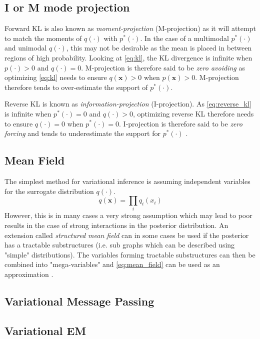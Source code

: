 \subsection{I or M mode projection}

Forward KL is also known as \textit{moment-projection} (M-projection)  as it will attempt to match the moments of $q(\cdot)$ with $p^*(\cdot)$. In the case of a multimodal $p^*(\cdot)$ and unimodal $q(\cdot)$, this may not be desirable as the mean is placed in between regions of high probability. Looking at \cref{eq:kl}, the KL divergence is infinite when $p(\cdot) > 0$ and $q(\cdot) = 0$. M-projection is therefore said to be \textit{zero avoiding} as optimizing \cref{eq:kl} needs to ensure $q(\mathbf{x}) > 0$ when $p(\mathbf{x}) > 0$. M-projection therefore tends to over-estimate the support of $p^*(\cdot)$.

Reverse KL is known as \textit{information-projection} (I-projection). As \cref{eq:reverse_kl} is infinite when $p^*(\cdot) = 0$ and $q(\cdot) > 0$, optimizing reverse KL therefore needs to ensure $q(\cdot) = 0$ when $p^*(\cdot)=0$. I-projection is therefore said to be \textit{zero forcing} and tends to underestimate the support for $p^*(\cdot)$ \cite{murphy}. 

\subsection{Mean Field}
The simplest method for variational inference is assuming independent variables for the surrogate distribution $q(\cdot)$. 
\begin{equation}\label{eq:mean_field}
    q(\mathbf{x}) = \prod_i q_i(x_i)
\end{equation}
However, this is in many cases a very strong assumption which may lead to poor results in the case of strong interactions in the posterior distribution. An extension called \textit{structured mean field} can in some cases be used if the posterior has a tractable substructures (i.e. sub graphs which can be described using "simple" distributions). The variables forming tractable substructures can then be combined into "mega-variables" and \cref{eq:mean_field} can be used as an approximation \cite{murphy}.

\subsection{Variational Message Passing}
\subsection{Variational EM}
